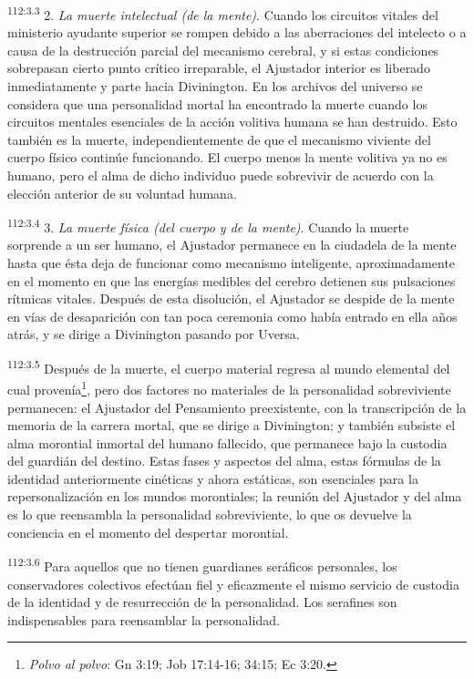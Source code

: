\par
\textsuperscript{112:3.3} 2. \textit{La muerte intelectual (de la mente)}. Cuando los circuitos vitales del ministerio ayudante superior se rompen debido a las aberraciones del intelecto o a causa de la destrucción parcial del mecanismo cerebral, y si estas condiciones sobrepasan cierto punto crítico irreparable, el Ajustador interior es liberado inmediatamente y parte hacia Divinington. En los archivos del universo se considera que una personalidad mortal ha encontrado la muerte cuando los circuitos mentales esenciales de la acción volitiva humana se han destruido. Esto también es la muerte, independientemente de que el mecanismo viviente del cuerpo físico continúe funcionando. El cuerpo menos la mente volitiva ya no es humano, pero el alma de dicho individuo puede sobrevivir de acuerdo con la elección anterior de su voluntad humana.

\par
\textsuperscript{112:3.4} 3. \textit{La muerte física (del cuerpo y de la mente)}. Cuando la muerte sorprende a un ser humano, el Ajustador permanece en la ciudadela de la mente hasta que ésta deja de funcionar como mecanismo inteligente, aproximadamente en el momento en que las energías medibles del cerebro detienen sus pulsaciones rítmicas vitales. Después de esta disolución, el Ajustador se despide de la mente en vías de desaparición con tan poca ceremonia como había entrado en ella años atrás, y se dirige a Divinington pasando por Uversa.

\par
\textsuperscript{112:3.5} Después de la muerte, el cuerpo material regresa al mundo elemental del cual provenía\footnote{\textit{Polvo al polvo}: Gn 3:19; Job 17:14-16; 34:15; Ec 3:20.}, pero dos factores no materiales de la personalidad sobreviviente permanecen: el Ajustador del Pensamiento preexistente, con la transcripción de la memoria de la carrera mortal, que se dirige a Divinington; y también subsiste el alma morontial inmortal del humano fallecido, que permanece bajo la custodia del guardián del destino. Estas fases y aspectos del alma, estas fórmulas de la identidad anteriormente cinéticas y ahora estáticas, son esenciales para la repersonalización en los mundos morontiales; la reunión del Ajustador y del alma es lo que reensambla la personalidad sobreviviente, lo que os devuelve la conciencia en el momento del despertar morontial.

\par
\textsuperscript{112:3.6} Para aquellos que no tienen guardianes seráficos personales, los conservadores colectivos efectúan fiel y eficazmente el mismo servicio de custodia de la identidad y de resurrección de la personalidad. Los serafines son indispensables para reensamblar la personalidad.

